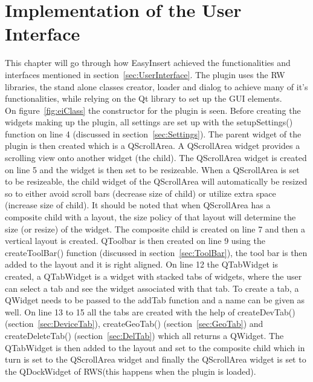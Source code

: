\clearpage


	
\section{Implementation of the User Interface}
This chapter will go through how EasyInsert achieved the functionalities and interfaces mentioned in section~\ref{sec:UserInterface}. The plugin uses the RW libraries, the stand alone classes creator, loader and dialog to achieve many of it's functionalities, while relying on the Qt library to set up the GUI elements.\\ 

On figure~\ref{fig:eiClass} the constructor for the plugin is seen. Before creating the widgets making up the plugin, all settings are set up with the setupSettings() function on line 4 (discussed in section~\ref{sec:Settings}). The parent widget of the plugin is then created which is a QScrollArea. A QScrollArea widget provides a scrolling view onto another widget (the child). The QScrollArea widget is created on line 5 and the widget is then set to be resizeable. When a QScrollArea is set to be resizeable, the child widget of the QScrollArea will automatically be resized so to either avoid scroll bars (decrease size of child) or utilize extra space (increase size of child). It should be noted that when QScrollArea has a composite child with a layout, the size policy of that layout will determine the size (or resize) of the widget. The composite child is created on line 7 and then a vertical layout is created. QToolbar is then created on line 9 using the createToolBar() function (discussed in section~\ref{sec:ToolBar}), the tool bar is then added to the layout and it is right aligned. On line 12 the QTabWidget is created, a QTabWidget is a widget with stacked tabs of widgets, where the user can select a tab and see the widget associated with that tab. To create a tab, a QWidget needs to be passed to the addTab function and a name can be given as well. On line 13 to 15 all the tabs are created with the help of createDevTab() (section~\ref{sec:DeviceTab}), createGeoTab() (section~\ref{sec:GeoTab}) and createDeleteTab() (section~\ref{sec:DelTab}) which all returns a QWidget. The QTabWidget is then added to the layout and set to the composite child which in turn is set to the QScrollArea widget and finally the QScrollArea widget is set to the QDockWidget of RWS(this happens when the plugin is loaded). 

